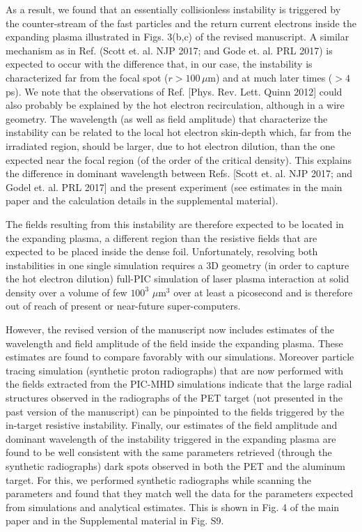 \documentclass[aps,showpacs,superscriptaddress]{revtex4}%
\begin{document}
\begin{enumerate}
As a result, we found that an essentially collisionless instability  is triggered by the counter-stream of the fast particles and the return current electrons  inside the expanding plasma illustrated in Figs. 3(b,c) of the revised manuscript.
A similar mechanism as in Ref. (Scott et. al. NJP 2017; and Gode et. al. PRL 2017)   is expected to occur with the difference that, in our case,  the instability is characterized far from the focal spot ($r > 100 \, \mu$m) and at much later times ($>4$ ps).
We note that the observations of Ref. [Phys. Rev. Lett. Quinn 2012] could also probably be explained by the hot electron recirculation, although  in a wire geometry.
The wavelength (as well as field amplitude) that characterize the instability can be related to the local hot electron skin-depth which,  far from the irradiated region, should be larger, due to hot electron dilution, than the one expected near the focal region (of the order of the critical density). This explains the difference in dominant wavelength between Refs. [Scott et. al. NJP 2017; and Godel et. al. PRL 2017]  and the present experiment (see estimates in the main paper and the calculation details in the supplemental material).

The fields resulting from this instability  are therefore expected to be located in the expanding plasma, a different region than the resistive fields that are expected to be placed inside the dense foil.
Unfortunately, resolving both instabilities in one single simulation requires a  3D geometry (in order to capture the hot electron dilution) full-PIC simulation of laser plasma interaction at solid density over a volume of  few   $100^3$ $\mu$m$^3$   over at least a picosecond and is therefore out of reach of present or near-future super-computers.

However, the revised version of the manuscript now includes estimates of the wavelength and field amplitude of the field inside the expanding plasma. These estimates are found to compare favorably with our simulations.  Moreover particle tracing simulation (synthetic proton radiographs) that are now performed with the fields extracted from the PIC-MHD simulations indicate that the large radial structures observed in the radiographs of the PET target (not presented in the past version of the manuscript) can be pinpointed to the fields triggered by the in-target resistive instability.
Finally, our estimates of the field amplitude and dominant wavelength of the instability triggered in the expanding plasma are found to be well consistent with the same parameters retrieved (through the synthetic radiographs) dark spots observed in both the PET and the aluminum target. For this, we performed synthetic radiographs while scanning the parameters and found that they match well the data for the parameters expected from simulations and analytical estimates. This is shown in Fig. 4  of the main paper  and in the Supplemental material in Fig. S9.


\end{enumerate}
\end{document}
